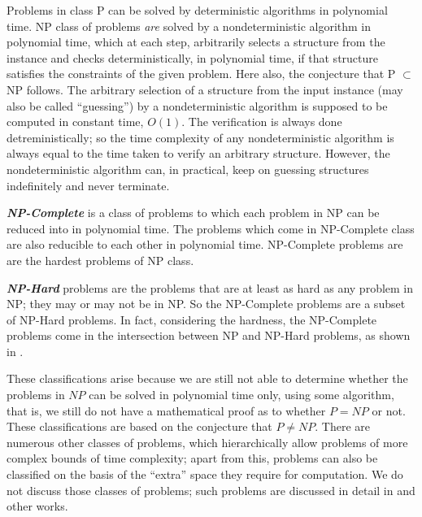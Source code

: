Problems in class P can be solved by deterministic algorithms in polynomial time. NP class of problems \textit{are} solved by a nondeterministic algorithm in polynomial time, which at each step, arbitrarily selects a structure from the instance and checks deterministically, in polynomial time, if that structure satisfies the constraints of the given problem. Here also, the conjecture that P $\subset$ NP follows. The arbitrary selection of a structure from the input instance (may also be called ``guessing'') by a nondeterministic algorithm is supposed to be computed in constant time, $O(1)$. The verification is always done detreministically; so the time complexity of any nondeterministic algorithm is always equal to the time taken to verify an arbitrary structure. However, the nondeterministic algorithm can, in practical, keep on guessing structures indefinitely and never terminate.

\textbf{\textit{NP-Complete}} is a class of problems to which each problem in NP can be reduced into in polynomial time. The problems which come in NP-Complete class are also reducible to each other in polynomial time. NP-Complete problems are are the hardest problems of NP class.

\textbf{\textit{NP-Hard}} problems are the problems that are at least as hard as any problem in NP; they may or may not be in NP. So the NP-Complete problems are a subset of NP-Hard problems. In fact, considering the hardness, the NP-Complete problems come in the intersection between NP and NP-Hard problems, as shown in .

These classifications arise because we are still not able to determine whether the problems in $NP$ can be solved in polynomial time only, using some algorithm, that is, we still do not have a mathematical proof as to whether $P=NP$ or not. These classifications are based on the conjecture that $P\neq NP$. There are numerous other classes of problems, which hierarchically allow problems of more complex bounds of time complexity; apart from this, problems can also be classified on the basis of the ``extra'' space they require for computation. We do not discuss those classes of problems; such problems are discussed in detail in \cite{Garey1979} and other works.

